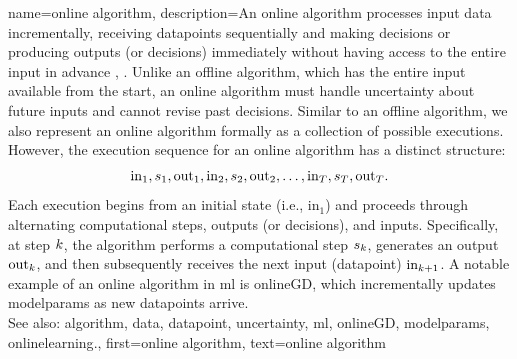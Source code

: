 {name={online algorithm},
	description={An online \gls{algorithm} processes input \gls{data} incrementally, 
		receiving \glspl{datapoint} sequentially and making decisions or producing outputs (or decisions) immediately 
		without having access to the entire input in advance \cite{PredictionLearningGames}, \cite{HazanOCO}. 
		Unlike an offline \gls{algorithm}, which has the entire input available from the start, an online \gls{algorithm} 
		must handle \gls{uncertainty} about future inputs and cannot revise past decisions. Similar to an 
		offline \gls{algorithm}, we also represent an online \gls{algorithm} formally as a collection of possible 
		executions. However, the execution sequence for an online \gls{algorithm} has a distinct structure:
		$${\rm in}_{1},s_1,{\rm out}_{1},{\rm in}_{2},s_2,{\rm out}_{2},\ldots,{\rm in}_{T},s_T,{\rm out}_{T}.$$ 
		Each execution begins from an initial state (i.e., \(\text{in}_{1}\)) and proceeds through alternating 
		computational steps, outputs (or decisions), and inputs. Specifically, at step \(k\), 
		the \gls{algorithm} performs a computational step \(s_{k}\), generates an output \(\text{out}_{k}\), 
		and then subsequently receives the next input (\gls{datapoint}) \(\text{in}_{k+1}\). A 
		notable example of an online \gls{algorithm} in \gls{ml} is \gls{onlineGD}, which incrementally 
		updates \gls{modelparams} as new \glspl{datapoint} arrive. 
					\\ 
		See also: \gls{algorithm}, \gls{data}, \gls{datapoint}, \gls{uncertainty}, \gls{ml}, \gls{onlineGD}, \gls{modelparams}, \gls{onlinelearning}.},
	first={online algorithm},
	text={online algorithm} 
}



